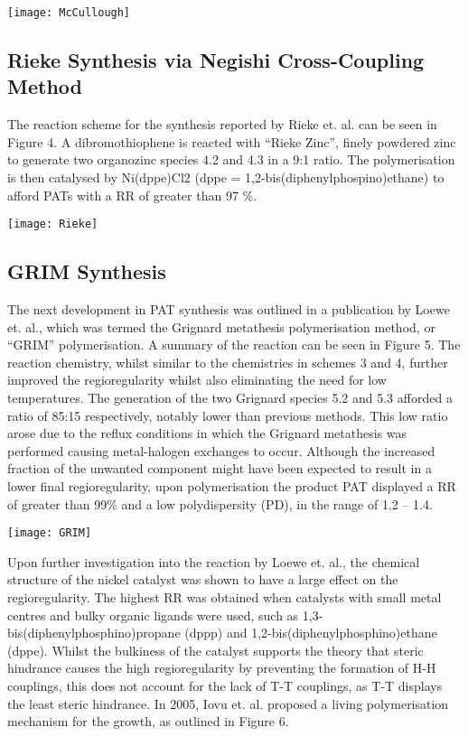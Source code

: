 \texttt{[image: McCullough]}

\subsection{Rieke Synthesis via Negishi Cross-Coupling Method}

The reaction scheme for the synthesis reported by Rieke et. al. can be seen in Figure 4. A dibromothiophene is reacted with “Rieke Zinc”, finely powdered zinc to generate two organozinc species 4.2 and 4.3 in a 9:1 ratio. The polymerisation is then catalysed by Ni(dppe)Cl2 (dppe = 1,2-bis(diphenylphospino)ethane) to afford PATs with a RR of greater than 97 \%.

\texttt{[image: Rieke]}

\subsection{GRIM Synthesis}

The next development in PAT synthesis was outlined in a publication by Loewe et. al., which was termed the Grignard metathesis polymerisation method, or “GRIM” polymerisation. A summary of the reaction can be seen in Figure 5.  The reaction chemistry, whilst similar to the chemistries in schemes 3 and 4, further improved the regioregularity whilst also eliminating the need for low temperatures. The generation of the two Grignard species 5.2 and 5.3 afforded a ratio of 85:15 respectively, notably lower than previous methods. This low ratio arose due to the reflux conditions in which the Grignard metathesis was performed causing metal-halogen exchanges to occur. Although the increased fraction of the unwanted component might have been expected to result in a lower final regioregularity, upon polymerisation the product PAT displayed a RR of greater than 99\% and a low polydispersity (PD), in the range of 1.2 – 1.4.

\texttt{[image: GRIM]}

Upon further investigation into the reaction by Loewe et. al., the chemical structure of the nickel catalyst was shown to have a large effect on the regioregularity. The highest RR was obtained when catalysts with small metal centres and bulky organic ligands were used, such as 1,3-bis(diphenylphosphino)propane (dppp) and 1,2-bis(diphenylphosphino)ethane (dppe). Whilst the bulkiness of the catalyst supports the theory that steric hindrance causes the high regioregularity by preventing the formation of H-H couplings, this does not account for the lack of T-T couplings, as T-T displays the least steric hindrance. In 2005, Iovu et. al. proposed a living polymerisation mechanism for the growth, as outlined in Figure 6.

